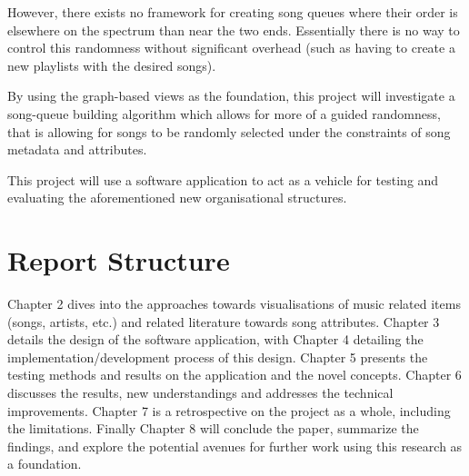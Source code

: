 However, there exists no framework for creating song queues where their order is elsewhere on the spectrum than near the two ends. Essentially there is no way to control this randomness without significant overhead (such as having to create a new playlists with the desired songs).


By using the graph-based views as the foundation, this project will investigate a song-queue building algorithm which allows for more of a guided randomness, that is allowing for songs to be randomly selected under the constraints of song metadata and attributes.

This project will use a software application to act as a vehicle for testing and evaluating the aforementioned new organisational structures.

\section{Report Structure}
Chapter 2 dives into the approaches towards visualisations of music related items (songs, artists, etc.) and related literature towards song attributes. Chapter 3 details the design of the software application, with Chapter 4 detailing the implementation/development process of this design. Chapter 5 presents the testing methods and results on the application and the novel concepts. Chapter 6 discusses the results, new understandings and addresses the technical improvements. Chapter 7 is a retrospective on the project as a whole, including the limitations. Finally Chapter 8 will conclude the paper, summarize the findings, and explore the potential avenues for further work using this research as a foundation.